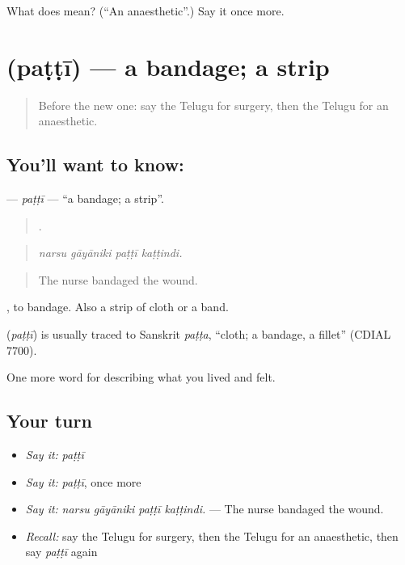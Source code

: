 \begin{tcolorbox}[breakable,colback=teal!4,colframe=teal!35!black,title={Before you move on}]
What does  mean? (\textquotedblleft{}An anaesthetic\textquotedblright{}.) Say it once more.
\end{tcolorbox}
\section[\texorpdfstring{\te{పట్టీ} (paṭṭī)}{పట్టీ (paṭṭī)}]{ (paṭṭī) — a bandage; a strip}

\label{lesson:TE-C519-patti}



\begin{quote}
Before the new one: say the Telugu for surgery, then the Telugu for an anaesthetic.
\end{quote}

\subsection*{You'll want to know: }
\textbf{} — \emph{paṭṭī} — \textquotedblleft{}a bandage; a strip\textquotedblright{}.

\begin{quote}
   .
\end{quote}

\begin{quote}
\emph{narsu gāyāniki paṭṭī kaṭṭindi.}
\end{quote}

\begin{quote}
The nurse bandaged the wound.
\end{quote}

 , to bandage. Also a strip of cloth or a band.

\begin{cousinweb}
\textbf{} (\emph{paṭṭī}) is usually traced to Sanskrit \emph{paṭṭa}, \textquotedblleft{}cloth; a bandage, a fillet\textquotedblright{} (CDIAL 7700).
\end{cousinweb}

\begin{grammarlens}[title={What you've built}]
One more word for describing what you lived and felt.
\end{grammarlens}

\subsection*{Your turn}
\begin{itemize}
\raggedright
  \item \emph{Say it:} \emph{paṭṭī}
  \item \emph{Say it:} \emph{paṭṭī}, once more
  \item \emph{Say it:} \emph{narsu gāyāniki paṭṭī kaṭṭindi.} — The nurse bandaged the wound.
  \item \emph{Recall:} say the Telugu for surgery, then the Telugu for an anaesthetic, then say \emph{paṭṭī} again
\end{itemize}


